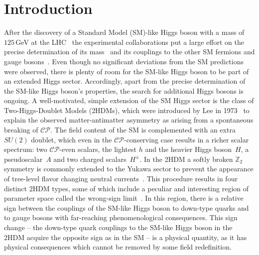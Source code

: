\documentclass[12pt]{article}
\newcommand{\abbrev}{\scalefont{.9}}
\newcommand{\lhc}{{\abbrev LHC}}
\newcommand{\sm}{{\abbrev SM}}
\newcommand{\thdm}{{\abbrev 2HDM}}
\newcommand{\cp}{{\abbrev $\mathcal{CP}$}}
\begin{document}
\section{Introduction}

After the discovery of a Standard Model (\sm{})-like Higgs boson with a mass of $125$\,GeV at the
\lhc{}~\cite{Aad:2012tfa,Chatrchyan:2012xdj} the experimental collaborations put a large effort on the precise
determination of its mass~\cite{Aad:2015zhl} and its couplings to the other \sm{} fermions and gauge
bosons~\cite{Khachatryan:2016vau}.
Even though no significant deviations from the \sm{} predictions were observed, there is plenty of room
for the \sm{}-like Higgs boson to be part of an extended Higgs sector.
Accordingly, apart from the precise determination of the \sm{}-like Higgs boson's properties, the
search for additional Higgs bosons is ongoing.
A well-motivated, simple extension of the \sm{} Higgs sector is the class of Two-Higgs-Doublet Models
(\thdm{}s), which were introduced by Lee in 1973~\cite{Lee:1973iz} to explain the observed
matter-antimatter asymmetry as arising from a spontaneous breaking of \cp{}.
The field content of the \sm{} is complemented with an extra $SU(2)$ doublet, which even in
the \cp{}-conserving case results in a richer scalar spectrum: two \cp{}-even scalars,
the lightest $h$ and the heavier Higgs boson~$H$, a pseudoscalar~$A$ and two charged scalars~$H^\pm$.
In the \thdm{} a softly broken $\mathbb{Z}_2$ symmetry is commonly extended to the Yukawa sector
to prevent the appearance of tree-level flavor changing neutral currents~\cite{Glashow:1976nt, Paschos:1976ay}.
This procedure results in four distinct \thdm{} types, some of which include a peculiar and interesting
region of parameter space called the wrong-sign
limit~\cite{Ferreira:2014naa,Ferreira:2014dya,Dumont:2014wha,Fontes:2014tga,Bernon:2014nxa,Biswas:2015zgk,
Modak:2016cdm}.
In this region, there is a relative sign between the couplings of the \sm{}-like Higgs boson to down-type
quarks and to gauge bosons with far-reaching phenomenological consequences. This sign change -- the down-type
quark couplings to the \sm{}-like Higgs boson in the 2HDM acquire the opposite sign as in the \sm{} -- is a
physical quantity, as it has physical consequences which cannot be removed by some field redefinition.
\end{document}
